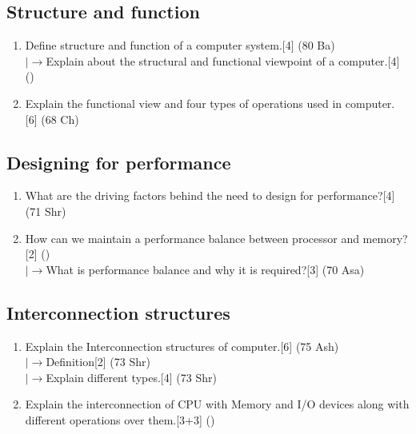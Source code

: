\documentclass[12pt]{article}
\newcommand{\lb}{\\$\left|\rightarrow\right.$}
\begin{document}
	\subsection{Structure and function}
	\begin{enumerate}[noitemsep, topsep = 0pt]
	\item Define structure and function of a computer system.\hfill[4] (80 Ba)
	\lb Explain about the structural and functional viewpoint of a computer.\hfill[4] ()
	\item Explain the functional view and four types of operations used in computer. \hfill[6] (68 Ch)
	\end{enumerate}
	\subsection{Designing for performance}
	\begin{enumerate}[noitemsep, topsep = 0pt]
	\item What are the driving factors behind the need to design for performance?\hfill[4] (71 Shr)
	\item How can we maintain a performance balance between processor and memory?\hfill[2] ()
	\lb What is performance balance and why it is required?\hfill[3] (70 Asa)
	\end{enumerate}
	\subsection{Interconnection structures}
	\begin{enumerate}[noitemsep, topsep = 0pt]
	\item Explain the Interconnection structures of computer.\hfill[6] (75 Ash)\
	\lb Definition\hfill[2] (73 Shr)
	\lb Explain different types.\hfill[4] (73 Shr)
	\item Explain the interconnection of CPU with Memory and I/O devices along with different operations over them.\hfill[3+3] ()
	\end{enumerate}
\end{document}
